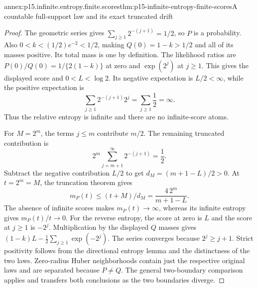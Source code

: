 \begin{annexitem}{annex:p15.infinite.entropy.finite.scores}{thm:p15-infinite-entropy-finite-scores}{A countable full-support law and its exact truncated drift}
\begin{proof}
The geometric series gives
\(\sum_{j\geq1}2^{-(j+1)}=1/2\), so \(P\) is a probability.
Also \(0<k<(1/2)e^{-2}<1/2\), making \(Q(0)=1-k>1/2\)
and all of its masses positive. Its total mass is one by definition.
The likelihood ratios are \(P(0)/Q(0)=1/\{2(1-k)\}\) at zero
and \(\exp(2^j)\) at \(j\geq1\). This gives the displayed score and
\(0<L<\log2\).
Its negative expectation is \(L/2<\infty\), while the positive
expectation is
\[
 \sum_{j\geq1}2^{-(j+1)}2^j=\sum_{j\geq1}\frac12=\infty.
\]
Thus the relative entropy is infinite and there are no infinite-score
atoms.

For \(M=2^m\), the terms \(j\leq m\) contribute \(m/2\).
The remaining truncated contribution is
\[
 2^m\sum_{j=m+1}^\infty2^{-(j+1)}=\frac12.
\]
Subtract the negative contribution \(L/2\) to get
\(d_M=(m+1-L)/2>0\). At \(t=2^m=M\), the truncation theorem gives
\[
 m_P(t)\leq(t+M)/d_M=\frac{4\,2^m}{m+1-L}.
\]
The absence of infinite scores makes \(m_P(t)\to\infty\), whereas
its infinite entropy gives \(m_P(t)/t\to0\).
For the reverse entropy, the score at zero is \(L\) and the score
at \(j\geq1\) is \(-2^j\). Multiplication by the displayed \(Q\)
masses gives \((1-k)L-\tfrac12\sum_{j\geq1}\exp(-2^j)\).
The series converges because \(2^j\geq j+1\).
Strict positivity follows from the directional entropy lemma and
the distinctness of the two laws.
Zero-radius Huber neighborhoods contain just the respective original
laws and are separated because \(P\ne Q\). The general two-boundary
comparison applies and transfers both conclusions as the two
boundaries diverge.
\end{proof}
\end{annexitem}

